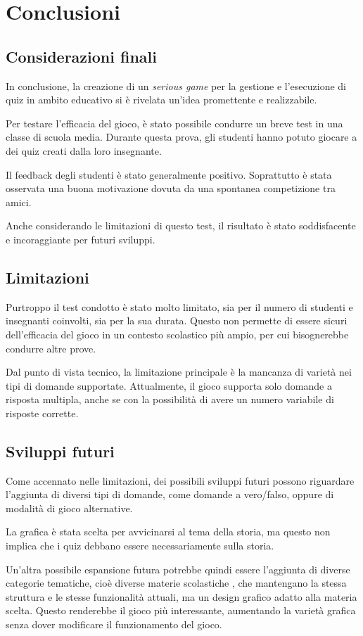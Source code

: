 \chapter{Conclusioni}
\section{Considerazioni finali}
In conclusione, la creazione di un \textit{serious game} per la gestione e l'esecuzione di quiz in ambito educativo si è rivelata un'idea promettente e realizzabile.

Per testare l'efficacia del gioco, è stato possibile condurre un breve test in una classe di scuola media.
Durante questa prova, gli studenti hanno potuto giocare a dei quiz creati dalla loro insegnante.

Il feedback degli studenti è stato generalmente positivo. Soprattutto è stata osservata una buona motivazione dovuta da una spontanea competizione tra amici.

Anche considerando le limitazioni di questo test, il risultato è stato soddisfacente e incoraggiante per futuri sviluppi.

\section{Limitazioni}
Purtroppo il test condotto è stato molto limitato, sia per il numero di studenti e insegnanti coinvolti, sia per la sua durata.
Questo non permette di essere sicuri dell'efficacia del gioco in un contesto scolastico più ampio, per cui bisognerebbe condurre altre prove.

Dal punto di vista tecnico, la limitazione principale è la mancanza di varietà nei tipi di domande supportate. Attualmente, il gioco supporta solo domande a risposta multipla, anche se con la possibilità di avere un numero variabile di risposte corrette.

\section{Sviluppi futuri}
Come accennato nelle limitazioni, dei possibili sviluppi futuri possono riguardare l'aggiunta di diversi tipi di domande, come domande a vero/falso, oppure di modalità di gioco alternative.

La grafica è stata scelta per avvicinarsi al tema della storia, ma questo non implica che i quiz debbano essere necessariamente sulla storia.

Un'altra possibile espansione futura potrebbe quindi essere l'aggiunta di diverse categorie tematiche, cioè diverse materie scolastiche , che mantengano la stessa struttura e le stesse funzionalità attuali, ma un design grafico adatto alla materia scelta.
Questo renderebbe il gioco più interessante, aumentando la varietà grafica senza dover modificare il funzionamento del gioco.